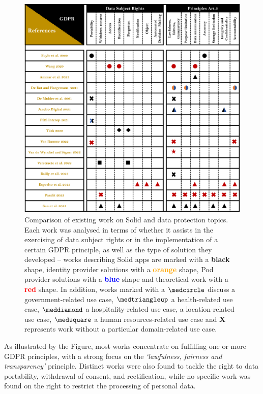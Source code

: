\begin{figure}[htp]
\centering
\includegraphics[width=\textwidth]{figures/chapter-2/solid-sota.png}
\caption[Comparison of existing work on Solid and data protection topics.]{Comparison of existing work on Solid and data protection topics. Each work was analysed in terms of whether it assists in the exercising of data subject rights or in the implementation of a certain GDPR principle, as well as the type of solution they developed -- works describing Solid apps are marked with a \textbf{black} shape, identity provider solutions with a \textbf{\textcolor{orange}{orange}} shape, Pod provider solutions with a \textbf{\textcolor{blue}{blue}} shape and theoretical work with a \textbf{\textcolor{red}{red}} shape. In addition, works marked with a $\medcircle$ discuss a government-related use case, $\medtriangleup$ a health-related use case, $\meddiamond$ a hospitality-related use case, \faStarO\space a location-related use case, $\medsquare$ a human resources-related use case and \textbf{X} represents work without a particular domain-related use case.}
\label{fig:solid_sota}
\end{figure}

As illustrated by the Figure, most works concentrate on fulfilling one or more GDPR principles, with a strong focus on the \textit{`lawfulness, fairness and transparency'} principle.
Distinct works were also found to tackle the right to data portability, withdrawal of consent, and rectification, while no specific work was found on the right to restrict the processing of personal data.

